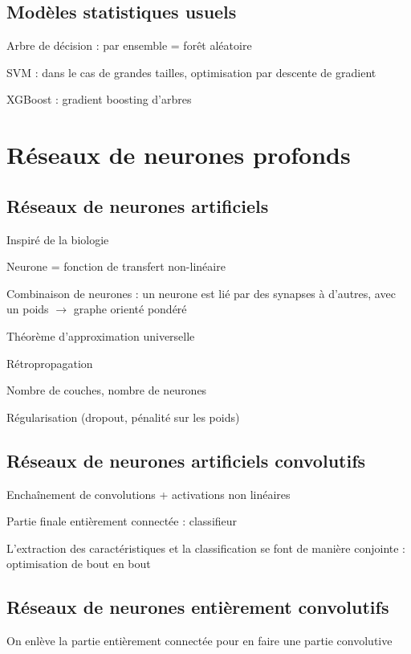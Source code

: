 \subsection{Modèles statistiques usuels}

Arbre de décision : par ensemble = forêt aléatoire

SVM : dans le cas de grandes tailles, optimisation par descente de gradient

XGBoost : gradient boosting d'arbres

\section{Réseaux de neurones profonds}

\subsection{Réseaux de neurones artificiels}

Inspiré de la biologie

Neurone = fonction de transfert non-linéaire

Combinaison de neurones : un neurone est lié par des synapses à d'autres, avec un poids
$\rightarrow$ graphe orienté pondéré

Théorème d'approximation universelle

Rétropropagation

Nombre de couches, nombre de neurones

Régularisation (dropout, pénalité sur les poids)

\subsection{Réseaux de neurones artificiels convolutifs}

Enchaînement de convolutions + activations non linéaires

Partie finale entièrement connectée : classifieur

L'extraction des caractéristiques et la classification se font de manière conjointe : optimisation de bout en bout

\subsection{Réseaux de neurones entièrement convolutifs}

On enlève la partie entièrement connectée pour en faire une partie convolutive

